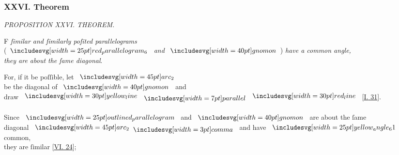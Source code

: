 \documentclass[12pt,preview]{standalone}
\begin{document}
\subsubsection{XXVI. Theorem}

\begin{minipage}[t]{0.64\textwidth}
    \vspace{0pt}

    \begin{center}
        \textit{PROPOSITION XXVI. THEOREM.}\label{book6pr26} \\
    \end{center}

    \hfill

    \begin{center}
        \raggedright \lettrine[lines=4, loversize=1, nindent=0pt]{}{}F \textit{ſimilar and ſimilarly poſited parallelograms}\\ (\hspace{-1ex}$\img{red_parallelogram_6}$ \textit{and} $\img[0][0][40]{gnomon}$\hspace{-1ex}) \textit{have a common angle,\\ they are about the ſame diagonal}.
    \end{center}

    \hfill

    \hfill

    \begin{center}
        For, if it be poſſible, let $\img[0][0][45]{arc_2}$\\
        be the diagonal  of $\img[0][0][40]{gnomon}$ and\\
        draw $\yellowline \bparallel \redline$ [\hyperref[book1pr31]{\textsc{I.} 31}].\\
        \hfill\\
        Since $\img{outlined_parallelogram}$ and $\img[0][0][40]{gnomon}$ are about the ſame\\
        diagonal $\img[0][0][45]{arc_2} \bcomma$ and have $\img{yellow_angle_61}$ common,\\
        they are ſimilar [\hyperref[book6pr24]{\textsc{VI.} 24}];
    \end{center}

    \hfill


\end{minipage}
\end{document}
